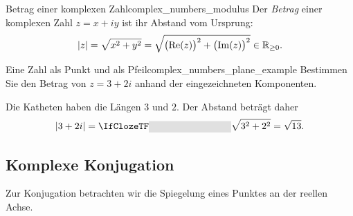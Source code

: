 \par\noindent\begin{minipage}{\linewidth}
\begin{DefinitionBox}{Betrag einer komplexen Zahl}{complex_numbers_modulus}
  Der \emph{Betrag}  einer komplexen Zahl $z=x+iy$
  ist ihr Abstand vom Ursprung:
  \[
    |z|=\sqrt{x^2+y^2}
       =\sqrt{\bigl(\operatorname{Re}(z)\bigr)^2+
                    \bigl(\operatorname{Im}(z)\bigr)^2}\in\mathbb{R}_{\ge0}.
  \]
\end{DefinitionBox}
\vspace{-0.5\baselineskip}
\begin{ExampleBox}{Eine Zahl als Punkt und als Pfeil}{complex_numbers_plane_example}
  Bestimmen Sie den Betrag von $z=3+2i$ anhand der eingezeichneten Komponenten.
  \par\smallskip
  \begin{minipage}[c]{0.50\linewidth}
  \end{minipage}\hfill
  \begin{minipage}[c]{0.45\linewidth}
    Die Katheten haben die Längen $3$ und $2$. Der Abstand beträgt daher
    \[
      |3+2i|=\Cloze{3cm}{\sqrt{3^2+2^2}=\sqrt{13}}.
    \]
  \end{minipage}
\end{ExampleBox}
\end{minipage}\par

\clearpage
\subsection{Komplexe Konjugation}
Zur Konjugation betrachten wir die Spiegelung eines Punktes an der reellen Achse.

